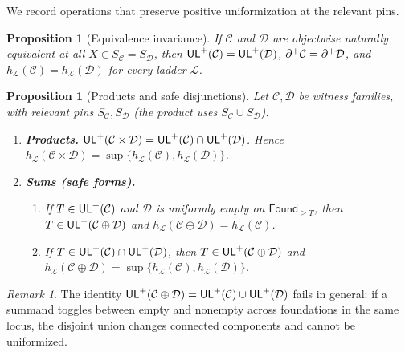 \documentclass[11pt]{article}
\newtheorem{proposition}[theorem]{Proposition}
\theoremstyle{definition}
\theoremstyle{remark}
\newtheorem{remark}[theorem]{Remark}
\newcommand{\Found}{\mathsf{Found}}
\begin{document}
We record operations that preserve positive uniformization at the relevant pins.

\begin{proposition}[Equivalence invariance]\label{p2:prop:eq-invariance}
If \(\mathcal C\) and \(\mathcal D\) are objectwise naturally equivalent at all \(X\in S_{\mathcal C}=S_{\mathcal D}\), then \(\mathsf{UL}^{+}(\mathcal C)=\mathsf{UL}^{+}(\mathcal D)\), \(\partial^{+}\mathcal C=\partial^{+}\mathcal D\), and \(h_{\mathcal L}(\mathcal C)=h_{\mathcal L}(\mathcal D)\) for every ladder \(\mathcal L\).
\end{proposition}

\begin{proposition}[Products and safe disjunctions]\label{p2:prop:prod-sum}
Let \(\mathcal C,\mathcal D\) be witness families, with relevant pins \(S_{\mathcal C},S_{\mathcal D}\) (the product uses \(S_{\mathcal C}\cup S_{\mathcal D}\)).
\begin{enumerate}
\item \textbf{Products.} \(\mathsf{UL}^{+}(\mathcal C\times\mathcal D)=\mathsf{UL}^{+}(\mathcal C)\cap\mathsf{UL}^{+}(\mathcal D)\). Hence \(h_{\mathcal L}(\mathcal C\times\mathcal D)=\sup\{h_{\mathcal L}(\mathcal C),h_{\mathcal L}(\mathcal D)\}\).
\item \textbf{Sums (safe forms).}
\begin{enumerate}
\item If \(T\in\mathsf{UL}^{+}(\mathcal C)\) and \(\mathcal D\) is \emph{uniformly empty} on \(\Found_{\ge T}\), then \(T\in\mathsf{UL}^{+}(\mathcal C\oplus\mathcal D)\) and \(h_{\mathcal L}(\mathcal C\oplus\mathcal D)=h_{\mathcal L}(\mathcal C)\).
\item If \(T\in\mathsf{UL}^{+}(\mathcal C)\cap\mathsf{UL}^{+}(\mathcal D)\), then \(T\in\mathsf{UL}^{+}(\mathcal C\oplus\mathcal D)\) and \(h_{\mathcal L}(\mathcal C\oplus\mathcal D)=\sup\{h_{\mathcal L}(\mathcal C),h_{\mathcal L}(\mathcal D)\}\).
\end{enumerate}
\end{enumerate}
\end{proposition}

\begin{remark}
The identity \(\mathsf{UL}^{+}(\mathcal C\oplus\mathcal D)=\mathsf{UL}^{+}(\mathcal C)\cup\mathsf{UL}^{+}(\mathcal D)\) fails in general:
if a summand toggles between empty and nonempty across foundations in the same locus, the disjoint union changes connected components and cannot be uniformized.
\end{remark}

\end{document}
